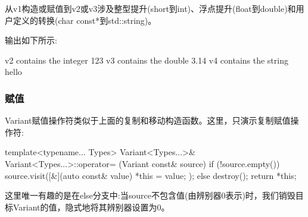 从v1构造或赋值到v2或v3涉及整型提升(short到int)、浮点提升(float到double)和用户定义的转换(char const*到std::string)。

输出如下所示:

\begin{shell}
v2 contains the integer 123
v3 contains the double 3.14
v4 contains the string hello
\end{shell}

\subsubsection{赋值}

Variant赋值操作符类似于上面的复制和移动构造函数。这里，只演示复制赋值操作符:

\begin{cpp}
template<typename... Types>
Variant<Types...>& Variant<Types...>::operator= (Variant const& source) {
	if (!source.empty()) {
		source.visit([&](auto const& value) {
			*this = value;
		});
	}
	else {
		destroy();
	}
	return *this;
}
\end{cpp}

这里唯一有趣的是在else分支中:当source不包含值(由辨别器0表示)时，我们销毁目标Variant的值，隐式地将其辨别器设置为0。


















